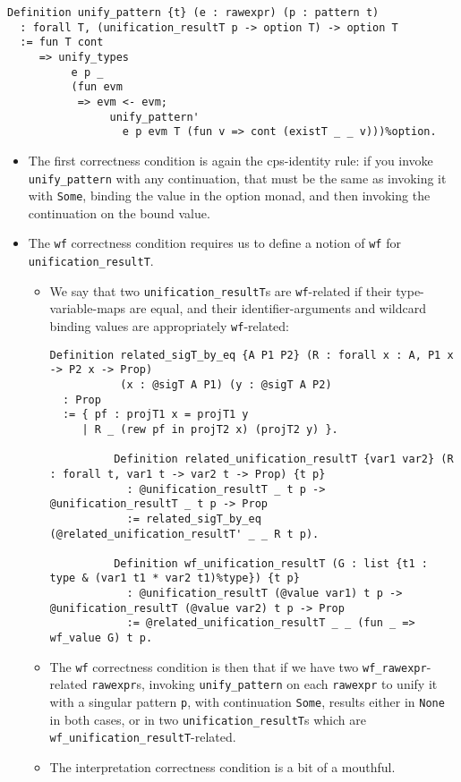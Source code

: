 \documentclass[
]{article}
\providecommand{\tightlist}{%
  \setlength{\itemsep}{0pt}\setlength{\parskip}{0pt}}
\begin{document}
\begin{itemize}
\begin{itemize}
\begin{itemize}
\begin{verbatim}
Definition unify_pattern {t} (e : rawexpr) (p : pattern t)
  : forall T, (unification_resultT p -> option T) -> option T
  := fun T cont
     => unify_types
          e p _
          (fun evm
           => evm <- evm;
                unify_pattern'
                  e p evm T (fun v => cont (existT _ _ v)))%option.
\end{verbatim}

      \begin{itemize}
      \tightlist
      \item
        The first correctness condition is again the cps-identity rule:
        if you invoke \texttt{unify\_pattern} with any continuation,
        that must be the same as invoking it with \texttt{Some}, binding
        the value in the option monad, and then invoking the
        continuation on the bound value.
      \item
        The \texttt{wf} correctness condition requires us to define a
        notion of \texttt{wf} for \texttt{unification\_resultT}.

        \begin{itemize}
        \item
          We say that two \texttt{unification\_resultT}s are
          \texttt{wf}-related if their type-variable-maps are equal, and
          their identifier-arguments and wildcard binding values are
          appropriately \texttt{wf}-related:

\begin{verbatim}
Definition related_sigT_by_eq {A P1 P2} (R : forall x : A, P1 x -> P2 x -> Prop)
           (x : @sigT A P1) (y : @sigT A P2)
  : Prop
  := { pf : projT1 x = projT1 y
     | R _ (rew pf in projT2 x) (projT2 y) }.

          Definition related_unification_resultT {var1 var2} (R : forall t, var1 t -> var2 t -> Prop) {t p}
            : @unification_resultT _ t p -> @unification_resultT _ t p -> Prop
            := related_sigT_by_eq (@related_unification_resultT' _ _ R t p).

          Definition wf_unification_resultT (G : list {t1 : type & (var1 t1 * var2 t1)%type}) {t p}
            : @unification_resultT (@value var1) t p -> @unification_resultT (@value var2) t p -> Prop
            := @related_unification_resultT _ _ (fun _ => wf_value G) t p.
\end{verbatim}
        \item
          The \texttt{wf} correctness condition is then that if we have
          two \texttt{wf\_rawexpr}-related \texttt{rawexpr}s, invoking
          \texttt{unify\_pattern} on each \texttt{rawexpr} to unify it
          with a singular pattern \texttt{p}, with continuation
          \texttt{Some}, results either in \texttt{None} in both cases,
          or in two \texttt{unification\_resultT}s which are
          \texttt{wf\_unification\_resultT}-related.
        \item
          The interpretation correctness condition is a bit of a
          mouthful.


\end{itemize}
\end{itemize}
\end{itemize}
\end{itemize}
\end{itemize}
\end{document}
